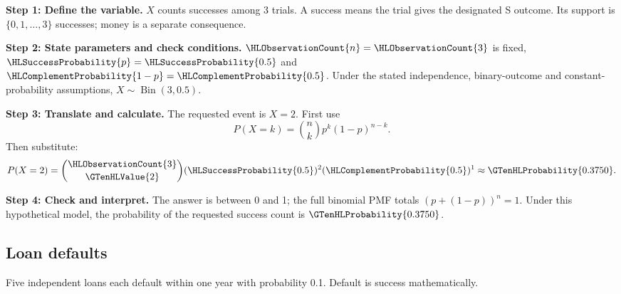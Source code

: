 \par\noindent\begin{minipage}{\linewidth}
\textbf{Step 1: Define the variable.} $X$ counts successes among 3 trials. A success means the trial gives the designated S outcome. Its support is $\{0,1,\ldots,3\}$ successes; money is a separate consequence.
\end{minipage}\par\medskip
\par\noindent\begin{minipage}{\linewidth}
\textbf{Step 2: State parameters and check conditions.} $\HLObservationCount{n}=\HLObservationCount{3}$ is fixed, $\HLSuccessProbability{p}=\HLSuccessProbability{0.5}$ and $\HLComplementProbability{1-p}=\HLComplementProbability{0.5}$. Under the stated independence, binary-outcome and constant-probability assumptions, $X\sim\operatorname{Bin}(3,0.5)$.
\end{minipage}\par\medskip
\par\noindent\begin{minipage}{\linewidth}
\textbf{Step 3: Translate and calculate.} The requested event is $ X=2$. First use
\[P(X=k)=\binom nk p^k(1-p)^{n-k}.\]
Then substitute:
\[P(X=2)=\binom{\HLObservationCount{3}}{\GTenHLValue{2}}(\HLSuccessProbability{0.5})^{2}(\HLComplementProbability{0.5})^{1}\approx \GTenHLProbability{0.3750}.\]
\end{minipage}\par\medskip
\par\noindent\begin{minipage}{\linewidth}
\textbf{Step 4: Check and interpret.} The answer is between 0 and 1; the full binomial PMF totals $(p+(1-p))^n=1$. Under this hypothetical model, the probability of the requested success count is $\GTenHLProbability{0.3750}$.
\end{minipage}\par\medskip
{}

\clearpage
\subsection{Loan defaults}\label{prob:loans}
Five independent loans each default within one year with probability 0.1. Default is success mathematically.


